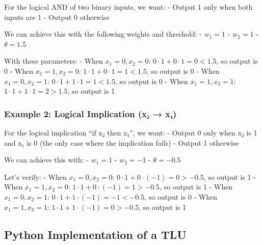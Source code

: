 \documentclass[
  letterpaper,
  DIV=11,
  numbers=noendperiod]{scrreprt}
\begin{document}
For the logical AND of two binary inputs, we want: - Output 1 only when
both inputs are 1 - Output 0 otherwise

We can achieve this with the following weights and threshold: -
\(w_1 = 1\) - \(w_2 = 1\) - \(\theta = 1.5\)

With these parameters: - When \(x_1 = 0, x_2 = 0\):
\(0 \cdot 1 + 0 \cdot 1 = 0 < 1.5\), so output is 0 - When
\(x_1 = 1, x_2 = 0\): \(1 \cdot 1 + 0 \cdot 1 = 1 < 1.5\), so output is
0 - When \(x_1 = 0, x_2 = 1\): \(0 \cdot 1 + 1 \cdot 1 = 1 < 1.5\), so
output is 0 - When \(x_1 = 1, x_2 = 1\):
\(1 \cdot 1 + 1 \cdot 1 = 2 > 1.5\), so output is 1

\subsubsection{Example 2: Logical Implication (x₂ →
x₁)}\label{example-2-logical-implication-xux2082-xux2081}

For the logical implication ``if x₂ then x₁'', we want: - Output 0 only
when x₂ is 1 and x₁ is 0 (the only case where the implication fails) -
Output 1 otherwise

We can achieve this with: - \(w_1 = 1\) - \(w_2 = -1\) -
\(\theta = -0.5\)

Let's verify: - When \(x_1 = 0, x_2 = 0\):
\(0 \cdot 1 + 0 \cdot (-1) = 0 > -0.5\), so output is 1 - When
\(x_1 = 1, x_2 = 0\): \(1 \cdot 1 + 0 \cdot (-1) = 1 > -0.5\), so output
is 1 - When \(x_1 = 0, x_2 = 1\):
\(0 \cdot 1 + 1 \cdot (-1) = -1 < -0.5\), so output is 0 - When
\(x_1 = 1, x_2 = 1\): \(1 \cdot 1 + 1 \cdot (-1) = 0 > -0.5\), so output
is 1

\subsection{Python Implementation of a
TLU}\label{python-implementation-of-a-tlu}
\end{document}
